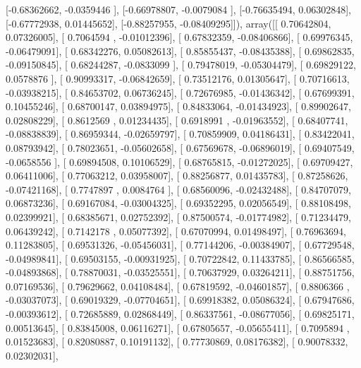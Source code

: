 \documentclass{article}
\begin{document}
       [-0.68362662, -0.0359446 ],
       [-0.66978807, -0.0079084 ],
       [-0.76635494,  0.06302848],
       [-0.67772938,  0.01445652],
       [-0.88257955, -0.08409295]]), array([[ 0.70642804,  0.07326005],
       [ 0.7064594 , -0.01012396],
       [ 0.67832359, -0.08406866],
       [ 0.69976345, -0.06479091],
       [ 0.68342276,  0.05082613],
       [ 0.85855437, -0.08435388],
       [ 0.69862835, -0.09150845],
       [ 0.68244287, -0.0833099 ],
       [ 0.79478019, -0.05304479],
       [ 0.69829122,  0.0578876 ],
       [ 0.90993317, -0.06842659],
       [ 0.73512176,  0.01305647],
       [ 0.70716613, -0.03938215],
       [ 0.84653702,  0.06736245],
       [ 0.72676985, -0.01436342],
       [ 0.67699391,  0.10455246],
       [ 0.68700147,  0.03894975],
       [ 0.84833064, -0.01434923],
       [ 0.89902647,  0.02808229],
       [ 0.8612569 ,  0.01234435],
       [ 0.6918991 , -0.01963552],
       [ 0.68407741, -0.08838839],
       [ 0.86959344, -0.02659797],
       [ 0.70859909,  0.04186431],
       [ 0.83422041,  0.08793942],
       [ 0.78023651, -0.05602658],
       [ 0.67569678, -0.06896019],
       [ 0.69407549, -0.0658556 ],
       [ 0.69894508,  0.10106529],
       [ 0.68765815, -0.01272025],
       [ 0.69709427,  0.06411006],
       [ 0.77063212,  0.03958007],
       [ 0.88256877,  0.01435783],
       [ 0.87258626, -0.07421168],
       [ 0.7747897 ,  0.0084764 ],
       [ 0.68560096, -0.02432488],
       [ 0.84707079,  0.06873236],
       [ 0.69167084, -0.03004325],
       [ 0.69352295,  0.02056549],
       [ 0.88108498,  0.02399921],
       [ 0.68385671,  0.02752392],
       [ 0.87500574, -0.01774982],
       [ 0.71234479,  0.06439242],
       [ 0.7142178 ,  0.05077392],
       [ 0.67070994,  0.01498497],
       [ 0.76963694,  0.11283805],
       [ 0.69531326, -0.05456031],
       [ 0.77144206, -0.00384907],
       [ 0.67729548, -0.04989841],
       [ 0.69503155, -0.00931925],
       [ 0.70722842,  0.11433785],
       [ 0.86566585, -0.04893868],
       [ 0.78870031, -0.03525551],
       [ 0.70637929,  0.03264211],
       [ 0.88751756,  0.07169536],
       [ 0.79629662,  0.04108484],
       [ 0.67819592, -0.04601857],
       [ 0.8806366 , -0.03037073],
       [ 0.69019329, -0.07704651],
       [ 0.69918382,  0.05086324],
       [ 0.67947686, -0.00393612],
       [ 0.72685889,  0.02868449],
       [ 0.86337561, -0.08677056],
       [ 0.69825171,  0.00513645],
       [ 0.83845008,  0.06116271],
       [ 0.67805657, -0.05655411],
       [ 0.7095894 ,  0.01523683],
       [ 0.82080887,  0.10191132],
       [ 0.77730869,  0.08176382],
       [ 0.90078332,  0.02302031],
\end{document}
